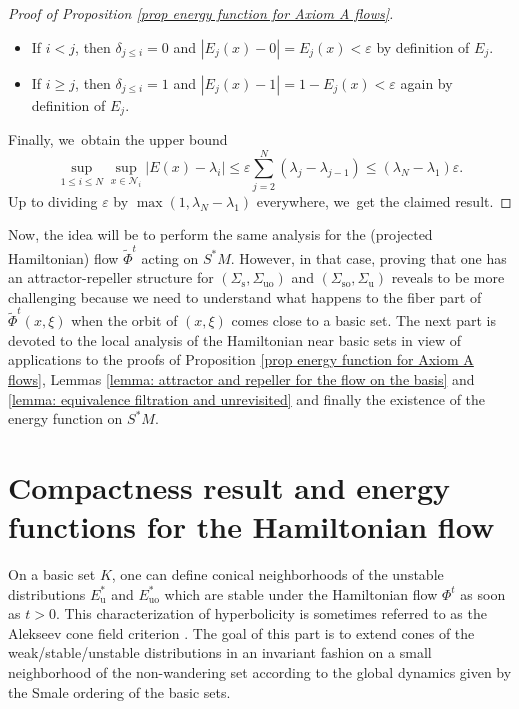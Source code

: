 \documentclass[11pt]{article}
\newcommand{\rs}{\mathrm{s}}
\newcommand{\rso}{\mathrm{so}}
\newcommand{\ru}{\mathrm{u}}
\newcommand{\ruo}{\mathrm{uo}}
\theoremstyle{definition}
\theoremstyle{plain}
\newcommand{\Ncal}{\mathcal{N}}
\begin{document}
\begin{proof}[Proof of Proposition \ref{prop energy function for Axiom A flows}]
\begin{itemize}
\item If $i < j$, then $\delta_{j \leq i} = 0$ and $|E_j (x) - 0| = E_j (x) < \varepsilon$ by definition of $E_j$.
\item If $i \geq j$, then $\delta_{j \leq i} = 1$ and $|E_j (x) - 1| = 1 - E_j (x) < \varepsilon$ again by definition of $E_j$.
\end{itemize}
Finally, we~obtain the upper bound
\[
\sup_{1 \leq i \leq N} \sup_{x \in \Ncal_i} |E (x) - \lambda_i| \leq \varepsilon \sum_{j = 2}^N (\lambda_j - \lambda_{j-1}) \leq (\lambda_N - \lambda_1) \varepsilon.
\]
Up to dividing $\varepsilon$ by $\max (1, \lambda_N- \lambda_1)$ everywhere, we~get the claimed result.
\end{proof}

Now, the idea will be to perform the same analysis for the (projected Hamiltonian) flow $\widetilde{\Phi}^t$ acting on $S^* M$. However, in that case, proving that one has an attractor-repeller structure for $(\Sigma_{\rs}, \Sigma_{\ruo})$ and $(\Sigma_{\rso}, \Sigma_{\ru})$ reveals to be more challenging because we need to understand what happens to the fiber part of $\widetilde{\Phi}^t (x,\xi)$ when the orbit of $(x,\xi)$ comes close to a basic set. The next part is devoted to the local analysis of the Hamiltonian near basic sets in view of applications to the proofs of Proposition \ref{prop energy function for Axiom A flows}, Lemmas \ref{lemma: attractor and repeller for the flow on the basis} and \ref{lemma: equivalence filtration and unrevisited} and finally the existence of the energy function on $S^*M$.

\section{Compactness result and energy functions for the Hamiltonian flow}\label{section: Compactness result and energy functions for the Hamiltonian flow}

On a basic set $K$, one can define conical neighborhoods of the unstable distributions $E_\ru^*$ and $E_{\ruo}^*$ which are stable under the Hamiltonian flow $\Phi^t$ as soon as $t > 0$. This characterization of hyperbolicity is sometimes referred to as the Alekseev cone field criterion \cite[Prop.\,5.1.7]{FH}. The goal of this part is to extend cones of the weak/stable/unstable distributions in an invariant fashion on a small neighborhood of the non-wandering set according to the global dynamics given by the Smale ordering of the basic sets.
\end{document}
